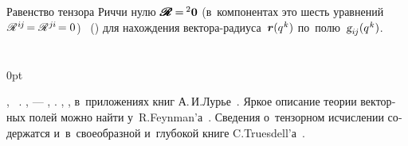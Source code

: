 \begin{otherlanguage}{russian}
Равенство тензора Риччи нулю
${\hspace{.1ex}\pmb{\scalebox{1.2}[1]{$\mathscr{R}$}} \hspace{-0.16ex} = \hspace{-0.2ex} {^2\bm{0}}}$ (в~компонентах это шесть уравнений ${\hspace{.1ex}\mathscr{R}^{\hspace{.1ex}i\hspace{-0.1ex}j} \hspace{-0.3ex} = \mathscr{R}^{\hspace{.1ex}j\hspace{-0.06ex}i} \hspace{-0.3ex} = 0}$)   ~() для нахождения вектора-радиуса~${\bm{r}(q^{\hspace{.1ex}k})}$ по~полю~${\textsl{g}_{i\hspace{-0.1ex}j}(q^{\hspace{.1ex}k})}$.

\end{otherlanguage}

\section*{\small \wordforbibliography}

\begin{changemargin}{\parindent}{0pt}
\fontsize{10}{12}\selectfont

\begin{otherlanguage}{russian}

, ~\cite{mcconnell-tensoranalysis, schouten-tensoranalysis, sokolnikoff-tensoranalysis, borisenko.tarapov, rashevsky-riemanniangeometry}. ,  \:--- , .
  , , в~приложениях книг А.\,И.\;Лурье~\cite{lurie-nonlinearelasticity, lurie-theoryofelasticity}.
Яркое описание теории векторных полей можно найти у~R.\:Feynman’а~\cite{feynman-lecturesonphysics}.
Сведения о~тензорном исчислении содержатся и~в~своеобразной и~глубокой книге C.\:Truesdell’а~\cite{truesdell-firstcourse}.

\end{otherlanguage}

\end{changemargin}

